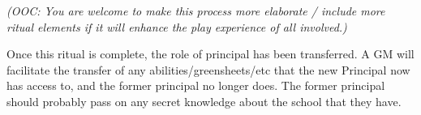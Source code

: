 \documentclass[green]{GL2020}
\begin{document}
\emph{(OOC: You are welcome to make this process more elaborate / include more ritual elements if it will enhance the play experience of all involved.)}

Once this ritual is complete, the role of principal has been transferred. A GM will facilitate the transfer of any abilities/greensheets/etc that the new Principal now has access to, and the former principal no longer does. The former principal should probably pass on any secret knowledge about the school that they have.
\end{document}
